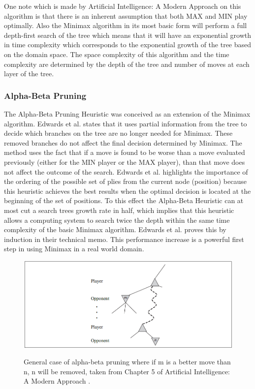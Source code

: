 \documentclass[journal]{IEEEtran}
\begin{document}
  One note which is made by Artificial Intelligence: A Modern Approach \cite{AIModern} on this algorithm is that there is an inherent assumption that both MAX and MIN play optimally. Also the Minimax algorithm in its most basic form will perform a full depth-first search of the tree which means that it will have an exponential growth in time complexity which corresponds to the exponential growth of the tree based on the domain space. The space complexity of this algorithm and the time complexity are determined by the depth of the tree and number of moves at each layer of the tree.\\
  
  \subsubsection{Alpha-Beta Pruning}
  The Alpha-Beta Pruning Heuristic was conceived as an extension of the Minimax algorithm. Edwards et al. \cite{AIM030} states that it uses partial information from the tree to decide which branches on the tree are no longer needed for Minimax. These removed branches do not affect the final decision determined by Minimax. The method uses the fact that if a move is found to be worse than a move evaluated previously (either for the MIN player or the MAX player), than that move does not affect the outcome of the search. Edwards et al. \cite{AIM030} highlights the importance of the ordering of the possible set of plies from the current node (position) because this heuristic achieves the best results when the optimal decision is located at the beginning of the set of positions. To this effect the Alpha-Beta Heuristic can at most cut a search trees growth rate in half, which implies that this heuristic allows a computing system to search twice the depth within the same time complexity of the basic Minimax algorithm. Edwards et al. \cite{AIM030} proves this by induction in their technical memo. This performance increase is a powerful first step in using Minimax in a real world domain.
  \\
  \begin{figure}[H]
    \includegraphics[width=.50\textwidth,scale=.50]{ab}\\
    \centering
    \caption{General case of alpha-beta pruning where if m is a better move than n, n will be removed, taken from Chapter 5 of Artificial Intelligence: A Modern Approach \cite{AIModern}.}
    \label{ab}
  \end{figure}
  
\end{document}
